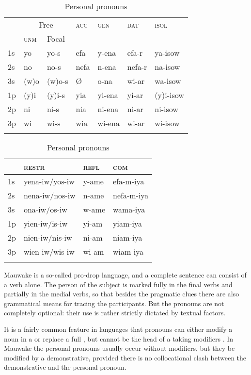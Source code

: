 \begin{table}  
\begin{tabular*}{.7\textwidth}{@{\extracolsep{\fill}}lllllll}
\mytoprule
 & \multicolumn{2}{c}{{Free}}
 & \textsc{acc} & \textsc{gen} & \textsc{dat} & \textsc{isol} \\
& \textsc{unm} & {Focal}  \\
\midrule
1s & yo & yo-s & efa & y-ena & efa-r & ya-isow        \\
2s & no & no-s & nefa & n-ena & nefa-r & na-isow      \\
3s & (w)o & (w)o-s & {\O} & o-na & wi-ar & wa-isow    \\
1p & (y)i & (y)i-s & yia & yi-ena & yi-ar & (y)i-isow \\
2p & ni & ni-s & nia & ni-ena & ni-ar & ni-isow       \\
3p & wi & wi-s & wia & wi-ena & wi-ar & wi-isow       \\
\mybottomrule
\end{tabular*}

\begin{tabular*}{.7\textwidth}{@{\extracolsep{\fill}}llll}
\mytoprule
& \textsc{restr} & \textsc{refl} & \textsc{com}\\
\midrule
 1s & yena-iw/yos-iw & y-ame   & efa-m-iya\\
 2s & nena-iw/nos-iw & n-ame & nefa-m-iya\\
 3s & ona-iw/os-iw & w-ame & wama-iya\\
 1p & yien-iw/is-iw & yi-am & yiam-iya\\
 2p & nien-iw/nis-iw & ni-am & niam-iya\\
 3p & wien-iw/wis-iw & wi-am & wiam-iya\\
\mybottomrule
\end{tabular*}

\caption{Personal pronouns}
\label{tab:9}
\end{table}

Mauwake is a so-called pro-drop language, and a complete sentence can consist of a verb alone. The person of the subject is marked fully in the final verbs and partially in the medial verbs, so that besides the pragmatic clues there are also grammatical means for tracing the participants. But the pronouns are not completely optional: their use is rather strictly dictated by textual factors.

It is a fairly common feature in languages that pronouns can either modify a noun in a  or replace a full , but cannot be the head of a  taking modifiers \citep[e.g.][]{ HakulinenEtAl1979,Saari1985,Roberts1987}. In Mauwake the personal pronouns usually occur without modifiers, but they  be modified by a demonstrative, provided there is no collocational clash between the demonstrative and the personal pronoun. 

